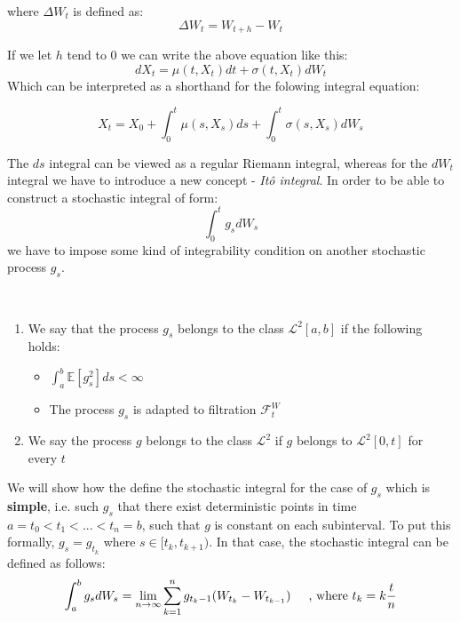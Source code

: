 \documentclass[times, utf8, diplomski]{fer}
\begin{document}
\noindent where $\Delta W_t$ is defined as:
\begin{equation}
	\Delta W_t = W_{t+h} - W_t
\end{equation}

\noindent If we let $h$ tend to $0$ we can write the above equation like this:
\begin{equation}
	dX_t = \mu(t,X_t)dt + \sigma(t, X_t)dW_t
\end{equation}
\noindent Which can be interpreted as a shorthand for the folowing integral equation:

\begin{equation}
	X_t = X_0 + \int_0^t \mu(s,X_s)ds + \int_0^t \sigma(s,X_s)dW_s
\end{equation}

\noindent The $ds$ integral can be viewed as a regular Riemann integral, whereas for the $dW_t$ integral we have to introduce a new concept - \textit{It\^{o} integral}.
In order to be able to construct a stochastic integral of form:
\begin{equation}
	\int_0^t g_sdW_s
\end{equation}
\noindent we have to impose some kind of integrability condition on another stochastic process $g_s$.

\begin{definition}~\\
\begin{enumerate}[label=(\roman*)]
	\item We say that the process $g_s$ belongs to the class $\mathcal{L}^2[a,b]$ if the following holds:
	\begin{itemize}
		\item $ \int_a^b\mathbb{E}[g_s^2]ds < \infty $
		\item The process $g_s$ is adapted to filtration $\mathcal{F}_t^W$
	\end{itemize}
	\item We say the process $g$ belongs to the class $\mathcal{L}^2$ if $g$ belongs to $\mathcal{L}^2[0,t]$ for every $t$
\end{enumerate}
\end{definition}

\noindent We will show how the define the stochastic integral for the case of $g_s$ which is \textbf{simple}, i.e. such $g_s$ that there exist deterministic points in time $a=t_0 < t_1 < ... < t_n = b$, such that $g$ is constant on each subinterval. To put this formally, $g_s=g_{t_k}$ where $s \in [t_k,t_{k+1})$. In that case, the stochastic integral can be defined as follows:
$$ \int_a^bg_sdW_s = \lim_{n\rightarrow\infty} \sum_{k=1}^n g_{t_k-1}(W_{t_k} - W_{t_{k-1}}) \hspace{0.5cm} \text{, where } t_k = k\frac{t}{n}$$
\end{document}
